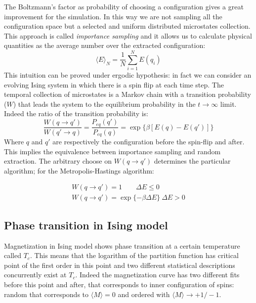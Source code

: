 \documentclass[11pt,a4paper]{article}
\begin{document}
\newpage
The Boltzmann's factor as probability of choosing a configuration gives a great improvement for the simulation. In this way we are not sampling all the configuration space but a selected and uniform distributed microstates collection. This approach is called \textit{importance sampling} and it allows us to calculate physical quantities as the average number over the extracted configuration:
\begin{equation}
  \langle E \rangle_N = \dfrac{1}{N} \sum_{i=1}^{N}{E(q_i)}
\end{equation} This intuition can be proved under ergodic hypothesis: in fact we can consider an evolving Ising system in which there is a spin flip at each time step. The temporal collection of microstates is a Markov chain with a transition probability ($W$) that leads the system to the equilibrium probability in the $t \rightarrow \infty$ limit. Indeed the ratio of the transition probability is:
$$ \dfrac{W(q \rightarrow q')}{W(q' \rightarrow q)} = \dfrac{P_{eq}(q')}{P_{eq}(q)}= \exp \lbrace \beta [E(q) - E(q')] \rbrace $$
Where $q$ and $q'$ are respectively the configuration before the spin-flip and after. This implies the equivalence between importance sampling and random extraction. The arbitrary choose on $W(q \rightarrow q')$ determines the particular algorithm; for the Metropolis-Hastings algorithm:

\begin{eqnarray}
  W(q \rightarrow q')=1 \qquad \Delta E \leq 0 \\
  W(q \rightarrow q')=\exp \lbrace -\beta \Delta E  \rbrace  \: \Delta E > 0
\end{eqnarray}

\bigskip

\subsection*{Phase transition in Ising model}
Magnetization in Ising model shows phase transition at a certain temperature called $T_c$. This means that the logarithm of the partition function has critical point of the first order in this point and two different statistical descriptions concurrently exist at $T_c$. Indeed the magnetization curve has two different fits before this point and after, that corresponds to inner configuration of spins: random that corresponds to $\langle M \rangle = 0$ and ordered with $\langle M \rangle \rightarrow +1 / -1$.
\end{document}
